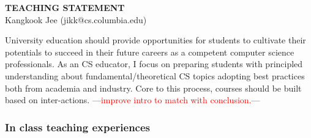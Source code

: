 \documentclass[letterpaper, 10pt]{article}
\newcommand{\jikk}[1]{{---\textcolor{red}{#1}---}}
\newcommand{\jikk}[1]{}
\begin{document}
\thispagestyle{fancy}

\lhead{}
\rhead{}

\renewcommand{\headrulewidth}{0pt} 
\renewcommand{\footrulewidth}{0pt} 

\fancyfoot[C]{\footnotesize
        \textcolor{gray}{http://www.cs.columbia.edu/$\sim$jikk/application}} 

\pagestyle{fancy}
\lhead{\textcolor{gray}{\it Kangkook Jee}}
\rhead{\textcolor{gray}{\thepage /\pageref{LastPage}}}

\begin{small}

\begin{center} {\LARGE \bf TEACHING STATEMENT}\\ \vspace*{0.1cm} {\normalsize
Kangkook Jee (jikk@cs.columbia.edu)} \end{center}
University education should provide opportunities for students to cultivate
their potentials to succeed in their future careers as a competent computer
science professionals.  
%
As an CS educator, I focus on preparing students with principled understanding
about fundamental/theoretical CS topics adopting best practices both from
academia and industry. Core to this process, courses should be built based on
inter-actions. 
\jikk{improve intro to match with conclusion.}



\subsubsection*{In class teaching experiences}


\end{small}
\end{document}
